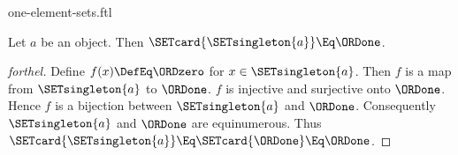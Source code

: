 \documentclass{stex}
\begin{document}
\begin{smodule}{one-element-sets.ftl}

\begin{proposition}[forthel]
  Let $a$ be an object.
  Then $\SETcard{\SETsingleton{a}} \Eq \ORDone$.
\end{proposition}
\begin{proof}[forthel]
  Define $f(x) \DefEq \ORDzero$ for $x \in \SETsingleton{a}$.
  Then $f$ is a map from $\SETsingleton{a}$ to $\ORDone$.
  $f$ is injective and surjective onto $\ORDone$.
  Hence $f$ is a bijection between $\SETsingleton{a}$ and $\ORDone$.
  Consequently $\SETsingleton{a}$ and $\ORDone$ are equinumerous.
  Thus $\SETcard{\SETsingleton{a}} \Eq \SETcard{\ORDone} \Eq \ORDone$.
\end{proof}
\end{smodule}
\end{document}
